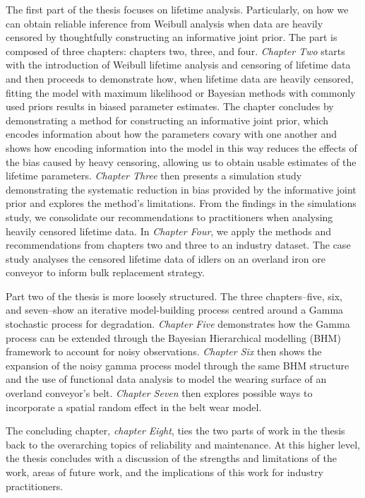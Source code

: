 The first part of the thesis focuses on lifetime analysis. Particularly, on how we can obtain reliable inference from Weibull analysis when data are heavily censored by thoughtfully constructing an informative joint prior. The part is composed of three chapters: chapters two, three, and four. \textit{Chapter Two} starts with the introduction of Weibull lifetime analysis and censoring of lifetime data and then proceeds to demonstrate how, when lifetime data are heavily censored, fitting the model with maximum likelihood or Bayesian methods with commonly used priors results in biased parameter estimates. The chapter concludes by demonstrating a method for constructing an informative joint prior, which encodes information about how the parameters covary with one another and shows how encoding information into the model in this way reduces the effects of the bias caused by heavy censoring, allowing us to obtain usable estimates of the lifetime parameters. \textit{Chapter Three} then presents a simulation study demonstrating the systematic reduction in bias provided by the informative joint prior and explores the method's limitations. From the findings in the simulations study, we consolidate our recommendations to practitioners when analysing heavily censored lifetime data. In \textit{Chapter Four}, we apply the methods and recommendations from chapters two and three to an industry dataset. The case study analyses the censored lifetime data of idlers on an overland iron ore conveyor to inform bulk replacement strategy.

Part two of the thesis is more loosely structured. The three chapters--five, six, and seven--show an iterative model-building process centred around a Gamma stochastic process for degradation. \textit{Chapter Five} demonstrates how the Gamma process can be extended through the Bayesian Hierarchical modelling (BHM) framework to account for noisy observations. \textit{Chapter Six} then shows the expansion of the noisy gamma process model through the same BHM structure and the use of functional data analysis to model the wearing surface of an overland conveyor's belt. \textit{Chapter Seven} then explores possible ways to incorporate a spatial random effect in the belt wear model.

The concluding chapter, \textit{chapter Eight}, ties the two parts of work in the thesis back to the overarching topics of reliability and maintenance. At this higher level, the thesis concludes with a discussion of the strengths and limitations of the work, areas of future work, and the implications of this work for industry practitioners.
